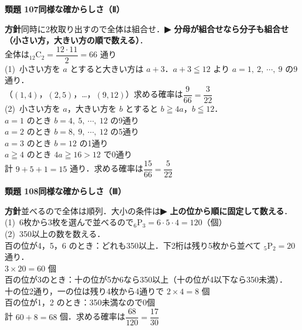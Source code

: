 \documentclass[a4paper,11pt]{ltjsarticle}
\newcommand{\ans}[2]{\Needspace{5\baselineskip}\vspace{6pt}%
  {\sffamily\bfseries 類題 #1\quad #2}\par}
\newcommand{\point}[1]{\textsf{\bfseries ▶ #1}}
\begin{document}
\ans{107}{同様な確からしさ（Ⅱ）}
\begin{kai}
\textbf{方針}\quad 同時に2枚取り出すので全体は組合せ．\point{分母が組合せなら分子も組合せ（小さい方，大きい方の順で数える）}．\\[2pt]
全体は\quad ${}_{12}\mathrm C_2=\dfrac{12\cdot11}{2}=66$ 通り\\[2pt]
(1)\ 小さい方を $a$ とすると大きい方は $a+3$．$a+3\leqq12$ より $a=1,\ 2,\ \cdots,\ 9$ の9通り．\\
\hspace*{1.5em}（$(1,4)$，$(2,5)$，…，$(9,12)$）\quad 求める確率は\quad $\dfrac{9}{66}=\dfrac{3}{22}$\\[2pt]
(2)\ 小さい方を $a$，大きい方を $b$ とすると $b\geqq4a$，$b\leqq12$．\\
\hspace*{1.5em}$a=1$ のとき $b=4,\ 5,\ \cdots,\ 12$ の9通り\\
\hspace*{1.5em}$a=2$ のとき $b=8,\ 9,\ \cdots,\ 12$ の5通り\\
\hspace*{1.5em}$a=3$ のとき $b=12$ の1通り\\
\hspace*{1.5em}$a\geqq4$ のとき $4a\geqq16>12$ で0通り\\
\hspace*{1.5em}計 $9+5+1=15$ 通り．\quad 求める確率は\quad $\dfrac{15}{66}=\dfrac{5}{22}$
\end{kai}

\ans{108}{同様な確からしさ（Ⅲ）}
\begin{kai}
\textbf{方針}\quad 並べるので全体は順列．大小の条件は\point{上の位から順に固定して数える}．\\[2pt]
(1)\ 6枚から3枚を選んで並べるので\quad ${}_6\mathrm P_3=6\cdot5\cdot4=120$（個）\\[2pt]
(2)\ 350以上の数を数える．\\
\hspace*{1.5em}百の位が4，5，6 のとき：どれも350以上．下2桁は残り5枚から並べて ${}_5\mathrm P_2=20$ 通り．\\
\hspace*{3em}$3\times20=60$ 個\\
\hspace*{1.5em}百の位が3のとき：十の位が5か6なら350以上（十の位が4以下なら350未満）．\\
\hspace*{3em}十の位2通り，一の位は残り4枚から4通りで $2\times4=8$ 個\\
\hspace*{1.5em}百の位が1，2 のとき：350未満なので0個\\
\hspace*{1.5em}計 $60+8=68$ 個．\quad 求める確率は\quad $\dfrac{68}{120}=\dfrac{17}{30}$
\end{kai}
\end{document}
